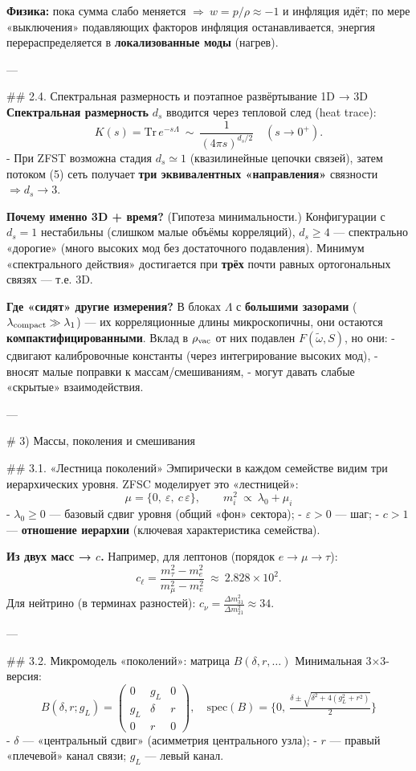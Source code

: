 \documentclass[12pt,a4paper]{article}
\begin{document}
\textbf{Физика:} пока сумма слабо меняется \(\Rightarrow\ w=p/\rho\approx -1\) и инфляция идёт; по мере «выключения» подавляющих факторов инфляция останавливается, энергия перераспределяется в \textbf{локализованные моды} (нагрев).

---

## 2.4. Спектральная размерность и поэтапное развёртывание 1D → 3D
\textbf{Спектральная размерность} \(d_s\) вводится через тепловой след (heat trace):
\[
K(s)=\mathrm{Tr}\,e^{-s\Lambda}\ \sim\ \frac{1}{(4\pi s)^{d_s/2}}\quad (s\to 0^+). \tag{11}
\]
- При ZFST возможна стадия \(d_s\simeq1\) (квазилинейные цепочки связей), затем потоком (5) сеть получает \textbf{три эквивалентных «направления»} связности \(\Rightarrow d_s\to3\).

\textbf{Почему именно 3D + время?}  
(Гипотеза минимальности.) Конфигурации с \(d_s=1\) нестабильны (слишком малые объёмы корреляций), \(d_s\ge4\) — спектрально «дорогие» (много высоких мод без достаточного подавления). Минимум «спектрального действия» достигается при \textbf{трёх} почти равных ортогональных связях — т.е. 3D.

\textbf{Где «сидят» другие измерения?}  
В блоках \(\Lambda\) с \textbf{большими зазорами} (\(\lambda_{\rm compact}\gg \lambda_1\)) — их корреляционные длины микроскопичны, они остаются \textbf{компактифицированными}. Вклад в \(\rho_{\rm vac}\) от них подавлен \(F(\tilde\omega,S)\), но они:
- сдвигают калибровочные константы (через интегрирование высоких мод),
- вносят малые поправки к массам/смешиваниям,
- могут давать слабые «скрытые» взаимодействия.

---

\# 3) Массы, поколения и смешивания

## 3.1. «Лестница поколений»
Эмпирически в каждом семействе видим три иерархических уровня. ZFSC моделирует это «лестницей»:
\[
\boxed{\ \ \mu=\{0,\ \varepsilon,\ c\,\varepsilon\},\qquad
m_i^2 \ \propto\ \lambda_0+\mu_i\ \ } \tag{12}
\]
- \(\lambda_0\ge0\) — базовый сдвиг уровня (общий «фон» сектора);
- \(\varepsilon>0\) — шаг;
- \(c>1\) — \textbf{отношение иерархии} (ключевая характеристика семейства).

\textbf{Из двух масс → \(c\).}  
Например, для лептонов (порядок \(e\to\mu\to\tau\)):
\[
c_\ell=\frac{m_\tau^2-m_e^2}{m_\mu^2-m_e^2}\ \approx\ 2.828\times10^2. \tag{13}
\]
Для нейтрино (в терминах разностей): \(c_\nu=\frac{\Delta m_{31}^2}{\Delta m_{21}^2}\approx 34\).

---

## 3.2. Микромодель «поколений»: матрица \(B(\delta,r,\dots)\)
Минимальная 3×3-версия:
\[
\boxed{\
B(\delta,r;g_L)=\begin{pmatrix}
0 & g_L & 0\\[2pt]
g_L & \delta & r\\[2pt]
0 & r & 0
\end{pmatrix},\quad
\mathrm{spec}(B)=\{0,\ \tfrac{\delta\pm\sqrt{\delta^2+4(g_L^2+r^2)}}{2}\}\ } \tag{14}
\]
- \(\delta\) — «центральный сдвиг» (асимметрия центрального узла);
- \(r\) — правый «плечевой» канал связи; \(g_L\) — левый канал.
\end{document}
